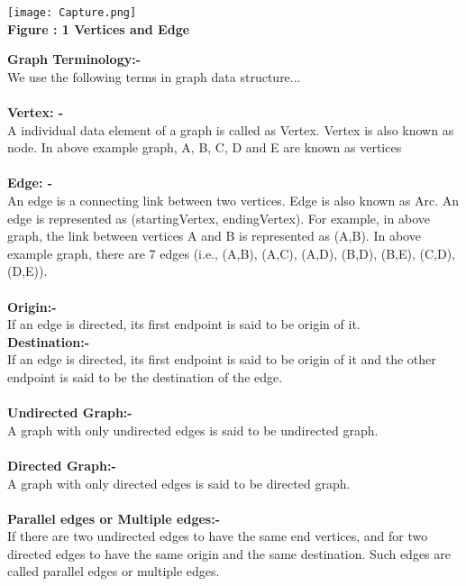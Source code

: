 \documentclass[11pt]{article}            %
\begin{document}
\begin{center}
 \texttt{[image: Capture.png]}\\ 
\textbf{Figure : 1 Vertices and Edge}
\vskip 0.5cm
\end{center}

\textbf{Graph Terminology:- }\\
We use the following terms in graph data structure...\\ \\

\textbf{Vertex: -}\\
A individual data element of a graph is called as Vertex. Vertex is also known as node. In above example graph, A, B, C, D and E are known as vertices 
\\ \\

\textbf{Edge: -}\\
An edge is a connecting link between two vertices. Edge is also known as Arc. An edge is represented as (startingVertex, endingVertex). For example, in above graph, the link between vertices A and B is represented as (A,B). In above example graph, there are 7 edges (i.e., (A,B), (A,C), (A,D), (B,D), (B,E), (C,D), (D,E)).
\\ \\

\textbf{Origin:-}\\
If an edge is directed, its first endpoint is said to be origin of it.
\\

\textbf{Destination:-}\\
If an edge is directed, its first endpoint is said to be origin of it and the other endpoint is said to be the destination of the edge.
\\ \\

\textbf{Undirected Graph:-}\\
A graph with only undirected edges is said to be undirected graph.
\\ \\

\textbf{Directed Graph:-}\\
A graph with only directed edges is said to be directed graph.
\\ \\

\textbf{Parallel edges or Multiple edges:-}\\
If there are two undirected edges to have the same end vertices, and for two directed edges to have the same origin and the same destination. Such edges are called parallel edges or multiple edges.
\\ \\
\end{document}

